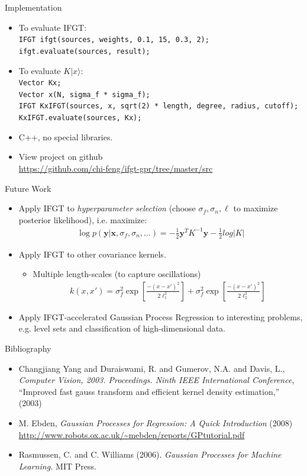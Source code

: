 \documentclass[xcolor=pdftex,dvipsnames,table]{beamer}
\newcommand{\eq}[1]{\begin{align*} #1 \end{align*}}
\let\vec\mathbf
\newcommand{\abs}[1]{\lvert #1 \rvert}
\newcommand{\ket}[1]{\lvert #1 \rangle}
\begin{document}
\begin{frame}{Implementation}
\begin{itemize}
\item To evaluate IFGT: \\
\small{
\texttt{IFGT ifgt(sources, weights, 0.1, 15,  0.3, 2);} \\
\texttt{ifgt.evaluate(sources, result);}}
\parbox{3in}{}
\item To evaluate $K\ket{x}$:\\
\texttt{Vector Kx;} \\
\texttt{Vector x(N, sigma\_f * sigma\_f);} \\
\texttt{IFGT KxIFGT(sources, x, sqrt(2) * length, degree, radius, cutoff);} \\
\texttt{KxIFGT.evaluate(sources, Kx);}
\end{itemize}
\begin{itemize}
  \item C++, no special libraries. 
  \item View project on github \\
  \small{\url{https://github.com/chi-feng/ifgt-gpr/tree/master/src}}
  \end{itemize}  
\end{frame}

\begin{frame}{Future Work}
\begin{itemize}
  \item Apply IFGT to \emph{hyperparameter selection} (choose $\sigma_f, \sigma_n, \ell$ to maximize posterior likelihood), i.e. maximize:
  \eq{\log p(\vec{y}|\vec{x},\sigma_f, \sigma_n,\dots) = -\frac{1}{2}\vec{y}^T K^{-1}\vec{y}-\frac{1}{2}log\abs{K}}
  \item Apply IFGT to other covariance kernels.
  \begin{itemize}
    \item Multiple length-scales (to capture oscillations)
    \eq{ k(x,x') = \sigma_f^2 \exp\left[\frac{-(x-x')^2}{2\ell_1^2}\right] + \sigma_f^2 \exp\left[\frac{-(x-x')^2}{2\ell_2^2}\right]}
    \end{itemize}
  \item Apply IFGT-accelerated Gaussian Process Regression to interesting problems, e.g. level sets and classification of high-dimensional data. 
\end{itemize}
\end{frame}

\begin{frame}{Bibliography}
  \begin{itemize}
  \item Changjiang Yang and Duraiswami, R. and Gumerov, N.A. and Davis, L., \emph{Computer Vision, 2003. Proceedings. Ninth IEEE International Conference}, 
  ``Improved fast gauss transform and efficient kernel density estimation,'' (2003)
  \item M. Ebden, \emph{Gaussian Processes for Regression: A Quick Introduction} (2008) \url{http://www.robots.ox.ac.uk/~mebden/reports/GPtutorial.pdf}
  \item Rasmussen, C. and C. Williams (2006). \emph{Gaussian Processes for Machine Learning.} MIT Press.
  \end{itemize}
  \end{frame}
\end{document}
